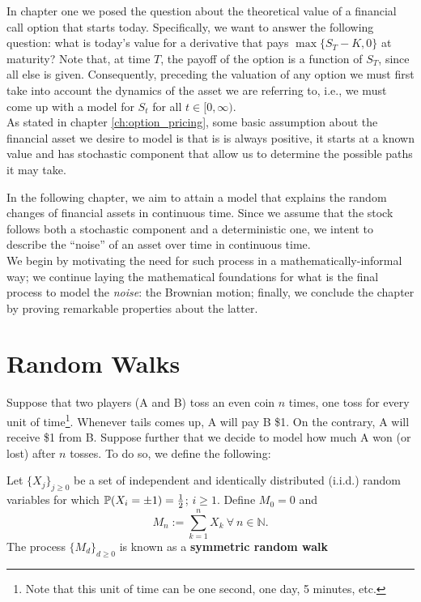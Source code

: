 \documentclass[../TGMAFFIRO]{subfiles}
\begin{document}
In chapter one we posed the question about the theoretical value of a financial call option that starts today. Specifically, we want to answer the following question: what is today's value for a derivative that pays $\max\{S_T-K, 0\}$ at maturity? Note that, at time $T$, the payoff of the option is a function of $S_T$, since all else is given. Consequently, preceding the valuation of any option we must first take into account the dynamics of the asset we are referring to, i.e., we must come up with a model for $S_t$ for all $t \in [0,\infty)$.\\

As stated in chapter \ref{ch:option_pricing}, some basic assumption about the financial asset we desire to model is that is is always positive, it starts at a known value and has stochastic component that allow us to determine the possible paths it may take.

In the following chapter, we aim to attain a model that explains the random changes of financial assets in continuous time. Since we assume that the stock follows both a stochastic component and a deterministic one, we intent to describe the ``noise'' of an asset over time in continuous time.\\

We begin by motivating the need for such process in a mathematically-informal way; we continue laying the mathematical foundations for what is the final process to model the \textit{noise}: the Brownian motion; finally, we conclude the chapter by proving remarkable properties about the latter.

\section{Random Walks}
Suppose that two players (A and B) toss an even coin $n$ times, one toss for every unit of time\footnote{Note that this unit of time can be one second, one day, 5 minutes, etc.}. Whenever tails comes up, A will pay B \$1. On the contrary, A will receive \$1 from B. Suppose further that we decide to model how much A won (or lost) after $n$ tosses. To do so, we define the following:

\begin{definition}\label{srwalk}
	Let $\{X_j\}_{j\geq0}$ be a set of independent and identically distributed (i.i.d.) random variables for which $\mathbb{P}(X_i = \pm 1) = \frac{1}{2}$; $i \geq 1$. Define $M_0 = 0$ and
	\begin{equation}
		M_n := \sum_{k=1}^n X_k \ \forall \ n \in \mathbb{N}.
	\end{equation}
	The process $\{M_d\}_{d\geq 0}$ is known as a \textbf{symmetric random walk}
\end{definition}
\end{document}
